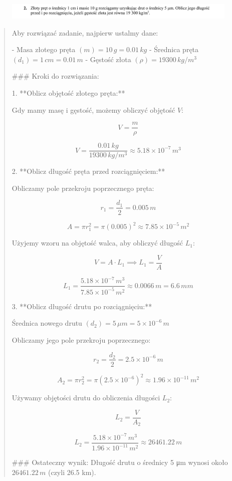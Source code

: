 \documentclass{article}
\begin{document}
    \begin{figure}[h!]
        \centering
        \includegraphics[width=1\textwidth]{Solutions/Zestaw 01/desc_02.png}
    \end{figure}

    \begin{quote}
    Aby rozwiązać zadanie, najpierw ustalmy dane:

- Masa złotego pręta \( (m) = 10 \, g = 0.01 \, kg \)
- Średnica pręta \( (d_1) = 1 \, cm = 0.01 \, m \)
- Gęstość złota \( (\rho) = 19300 \, kg/m^3 \)

### Kroki do rozwiązania:

1. **Oblicz objętość złotego pręta:**

   Gdy mamy masę i gęstość, możemy obliczyć objętość \( V \):

   \[
   V = \frac{m}{\rho}
   \]

   \[
   V = \frac{0.01 \, kg}{19300 \, kg/m^3} \approx 5.18 \times 10^{-7} \, m^3
   \]

2. **Oblicz długość pręta przed rozciągnięciem:**

   Obliczamy pole przekroju poprzecznego pręta:

   \[
   r_1 = \frac{d_1}{2} = 0.005 \, m
   \]

   \[
   A = \pi r_1^2 = \pi (0.005)^2 \approx 7.85 \times 10^{-5} \, m^2
   \]

   Użyjemy wzoru na objętość walca, aby obliczyć długość \( L_1 \):

   \[
   V = A \cdot L_1 \implies L_1 = \frac{V}{A}
   \]

   \[
   L_1 = \frac{5.18 \times 10^{-7} \, m^3}{7.85 \times 10^{-5} \, m^2} \approx 0.0066 \, m = 6.6 \, mm
   \]

3. **Oblicz długość drutu po rozciągnięciu:**

   Średnica nowego drutu \( (d_2) = 5 \, \mu m = 5 \times 10^{-6} \, m \)

   Obliczamy jego pole przekroju poprzecznego:

   \[
   r_2 = \frac{d_2}{2} = 2.5 \times 10^{-6} \, m
   \]

   \[
   A_2 = \pi r_2^2 = \pi (2.5 \times 10^{-6})^2 \approx 1.96 \times 10^{-11} \, m^2
   \]

   Używamy objętości drutu do obliczenia długości \( L_2 \):

   \[
   L_2 = \frac{V}{A_2}
   \]

   \[
   L_2 = \frac{5.18 \times 10^{-7} \, m^3}{1.96 \times 10^{-11} \, m^2} \approx 26461.22 \, m
   \]

### Ostateczny wynik:
Długość drutu o średnicy 5 μm wynosi około \( 26461.22 \, m \) (czyli 26.5 km).
    \end{quote}
    
\end{document}
